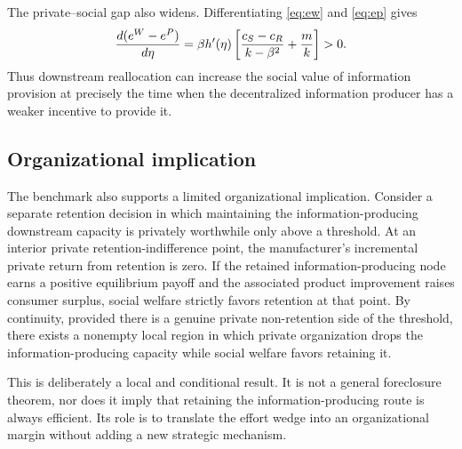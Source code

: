 The private--social gap also widens. Differentiating \eqref{eq:ew} and \eqref{eq:ep} gives
\begin{equation}
    \frac{d(e^{W}-e^{P})}{d\eta}
    =\beta h'(\eta)
    \left[
    \frac{c_S-c_R}{k-\beta^2}+\frac{m}{k}
    \right]>0.
    \label{eq:wedgepw}
\end{equation}
Thus downstream reallocation can increase the social value of information provision at precisely the time when the decentralized information producer has a weaker incentive to provide it.

\subsection{Organizational implication}

The benchmark also supports a limited organizational implication. Consider a separate retention decision in which maintaining the information-producing downstream capacity is privately worthwhile only above a threshold. At an interior private retention-indifference point, the manufacturer's incremental private return from retention is zero. If the retained information-producing node earns a positive equilibrium payoff and the associated product improvement raises consumer surplus, social welfare strictly favors retention at that point. By continuity, provided there is a genuine private non-retention side of the threshold, there exists a nonempty local region in which private organization drops the information-producing capacity while social welfare favors retaining it.

This is deliberately a local and conditional result. It is not a general foreclosure theorem, nor does it imply that retaining the information-producing route is always efficient. Its role is to translate the effort wedge into an organizational margin without adding a new strategic mechanism.
